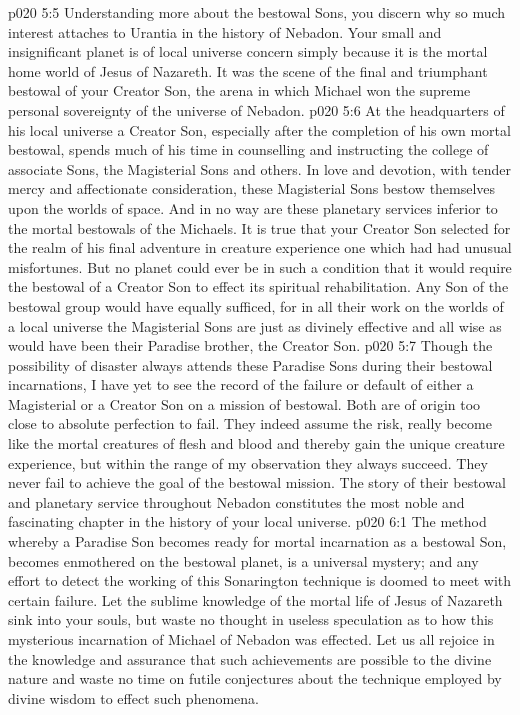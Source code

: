 \vs p020 5:5 \pc Understanding more about the bestowal Sons, you discern why so much interest attaches to Urantia in the history of Nebadon. Your small and insignificant planet is of local universe concern simply because it is the mortal home world of Jesus of Nazareth. It was the scene of the final and triumphant bestowal of your Creator Son, the arena in which Michael won the supreme personal sovereignty of the universe of Nebadon.
\vs p020 5:6 At the headquarters of his local universe a Creator Son, especially after the completion of his own mortal bestowal, spends much of his time in counselling and instructing the college of associate Sons, the Magisterial Sons and others. In love and devotion, with tender mercy and affectionate consideration, these Magisterial Sons bestow themselves upon the worlds of space. And in no way are these planetary services inferior to the mortal bestowals of the Michaels. It is true that your Creator Son selected for the realm of his final adventure in creature experience one which had had unusual misfortunes. But no planet could ever be in such a condition that it would require the bestowal of a Creator Son to effect its spiritual rehabilitation. Any Son of the bestowal group would have equally sufficed, for in all their work on the worlds of a local universe the Magisterial Sons are just as divinely effective and all wise as would have been their Paradise brother, the Creator Son.
\vs p020 5:7 \pc Though the possibility of disaster always attends these Paradise Sons during their bestowal incarnations, I have yet to see the record of the failure or default of either a Magisterial or a Creator Son on a mission of bestowal. Both are of origin too close to absolute perfection to fail. They indeed assume the risk, really become like the mortal creatures of flesh and blood and thereby gain the unique creature experience, but within the range of my observation they always succeed. They never fail to achieve the goal of the bestowal mission. The story of their bestowal and planetary service throughout Nebadon constitutes the most noble and fascinating chapter in the history of your local universe.
\vs p020 6:1 The method whereby a Paradise Son becomes ready for mortal incarnation as a bestowal Son, becomes enmothered on the bestowal planet, is a universal mystery; and any effort to detect the working of this Sonarington technique is doomed to meet with certain failure. Let the sublime knowledge of the mortal life of Jesus of Nazareth sink into your souls, but waste no thought in useless speculation as to how this mysterious incarnation of Michael of Nebadon was effected. Let us all rejoice in the knowledge and assurance that such achievements are possible to the divine nature and waste no time on futile conjectures about the technique employed by divine wisdom to effect such phenomena.
